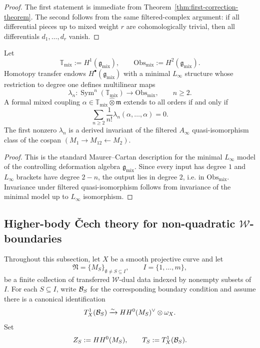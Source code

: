 \begin{proof}
The first statement is immediate from Theorem~\ref{thm:first-correction-theorem}. The second follows from the same filtered-complex argument: if all differential pieces up to mixed weight $r$ are cohomologically trivial, then all differentials $d_1,\dots,d_r$ vanish.
\end{proof}

\begin{theorem}
Let
\[
\mathbb T_{\mathrm{mix}}:=H^1(\mathfrak g_{\mathrm{mix}}),
\qquad
\mathrm{Obs}_{\mathrm{mix}}:=H^2(\mathfrak g_{\mathrm{mix}}).
\]
Homotopy transfer endows $H^\bullet(\mathfrak g_{\mathrm{mix}})$ with a minimal $L_\infty$ structure whose restriction to degree one defines multilinear maps
\[
\lambda_n : \operatorname{Sym}^n(\mathbb T_{\mathrm{mix}}) \longrightarrow \mathrm{Obs}_{\mathrm{mix}},
\qquad n\ge 2.
\]
A formal mixed coupling $\alpha\in \mathbb T_{\mathrm{mix}}\widehat\otimes \mathfrak m$ extends to all orders if and only if
\[
\sum_{n\ge 2}\frac{1}{n!}\lambda_n(\alpha,\dots,\alpha)=0.
\]
The first nonzero $\lambda_n$ is a derived invariant of the filtered $A_\infty$ quasi-isomorphism class of the cospan $(M_1\to M_{12}\leftarrow M_2)$.
\end{theorem}

\begin{proof}
This is the standard Maurer--Cartan description for the minimal $L_\infty$ model of the controlling deformation algebra $\mathfrak g_{\mathrm{mix}}$. Since every input has degree $1$ and $L_\infty$ brackets have degree $2-n$, the output lies in degree $2$, i.e. in $\mathrm{Obs}_{\mathrm{mix}}$. Invariance under filtered quasi-isomorphism follows from invariance of the minimal model up to $L_\infty$ isomorphism.
\end{proof}



\subsection{Higher-body \v{C}ech theory for non-quadratic $\mathcal W$-boundaries}

\begin{convention}
Throughout this subsection, let $X$ be a smooth projective curve and let
\[
\mathfrak N=\{M_S\}_{\emptyset\neq S\subseteq I},\qquad I=\{1,\dots,m\},
\]
be a finite collection of transferred $\mathcal W$-dual data indexed by nonempty subsets of $I$.
For each $S\subseteq I$, write $\mathcal{B}_S$ for the corresponding boundary condition and assume there is a canonical identification
\[
T^1_X(\mathcal{B}_S)
\xrightarrow{\sim}
HH^0(M_S)^\vee\otimes \omega_X.
\]
Set
\[
Z_S:=HH^0(M_S),\qquad T_S:=T^1_X(\mathcal{B}_S).
\]
\end{convention}

